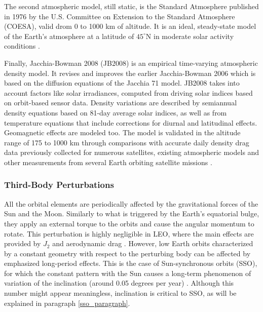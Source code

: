 The second atmospheric model, still static, is the Standard Atmosphere published in 1976 by the U.S. Committee on Extension to the Standard Atmosphere (COESA), valid drom 0 to 1000 km of altitude.
It is an ideal, steady-state model of the Earth's atmosphere at a latitude of $45^{\circ}$N in moderate solar activity conditions \cite{vallado2013fundamentals}.

Finally, Jacchia-Bowman 2008 (JB2008) is an empirical time-varying atmospheric density model. It revises and improves the earlier Jacchia-Bowman 2006 which is based on the diffusion equations of the Jacchia 71 model.
JB2008 takes into account factors like solar irradiances, computed from driving solar indices based on orbit-based sensor data.
Density variations are described by semiannual density equations based on 81-day average solar indices, as well as from temperature equations that include corrections for diurnal and latitudinal effects.
Geomagnetic effects are modeled too.
The model is validated in the altitude range of 175 to 1000 km through comparisons with accurate daily density drag data previously collected for numerous satellites, existing atmospheric models and other measurements from several Earth orbiting satellite missions \cite{bowman2008jb2006,bowman2008new}.


\subsubsection{Third-Body Perturbations}
All the orbital elements are periodically affected by the gravitational forces of the Sun and the Moon.
Similarly to what is triggered by the Earth's equatorial bulge, they apply an external torque to the orbits and cause the angular momentum to rotate.
This perturbation is highly negligible in LEO, where the main effects are provided by $J_2$ and aerodynamic drag \cite{wertz2009orbit}.
However, low Earth orbits characterized by a constant geometry with respect to the perturbing body can be affected by emphasized long-period effects.
This is the case of Sun-synchronous orbits (SSO), for which the constant pattern with the Sun causes a long-term phenomenon of variation of the inclination (around 0.05 degrees per year) \cite{giacaglia1994long}.
Although this number might appear meaningless, inclination is critical to SSO, as will be explained in paragraph \ref{sso_paragraph}.



